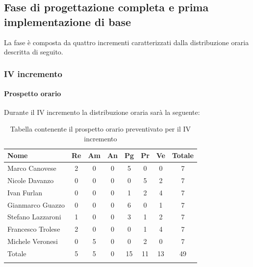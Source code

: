 \subsection{Fase di progettazione completa e prima implementazione di base}
La fase è composta da quattro incrementi caratterizzati dalla distribuzione oraria descritta di seguito.

\subsubsection{IV incremento}
\paragraph{Prospetto orario}
Durante il IV incremento la distribuzione oraria sarà la seguente:

\begin{longtable}{|l|c|c|c|c|c|c|c|}
	\hline
	\rowcolor{lighter-grayer}
	\textbf{Nome}     & \textbf{Re} & \textbf{Am} & \textbf{An} & \textbf{Pg} & \textbf{Pr} & \textbf{Ve} & \textbf{Totale} \\
	\hline
	\endfirsthead

	\hline
	Marco Canovese    & 2           & 0           & 0           & 5           & 0           & 0           & 7               \\
	\hline
	\hline
	Nicole Davanzo    & 0           & 0           & 0           & 0           & 5           & 2           & 7               \\
	\hline
	\hline
	Ivan Furlan       & 0           & 0           & 0           & 1           & 2           & 4           & 7               \\
	\hline
	\hline
	Gianmarco Guazzo  & 0           & 0           & 0           & 6           & 0           & 1           & 7               \\
	\hline
	\hline
	Stefano Lazzaroni & 1           & 0           & 0           & 3           & 1           & 2           & 7               \\
	\hline
	\hline
	Francesco Trolese & 2           & 0           & 0           & 0           & 1           & 4           & 7               \\
	\hline
	\hline
	Michele Veronesi  & 0           & 5           & 0           & 0           & 2           & 0           & 7               \\
	\hline
	\hline
	Totale            & 5           & 5          & 0          & 15           & 11           & 13           & 49              \\
	\hline
	\rowcolor{white}
	\caption{Tabella contenente il prospetto orario preventivato per il IV incremento}
\end{longtable}


